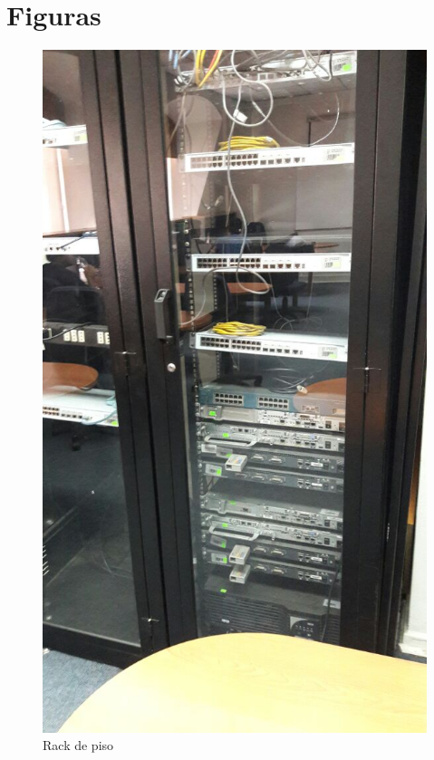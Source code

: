 \documentclass[onecolumn,11pts]{IEEEtran}
\begin{document}
\section{Figuras}
\begin{figure}[h!]
\centering
 \includegraphics[scale=0.4]{rack}
\caption{Rack de piso}
\label{fig:rack}
\end{figure}
\end{document}
